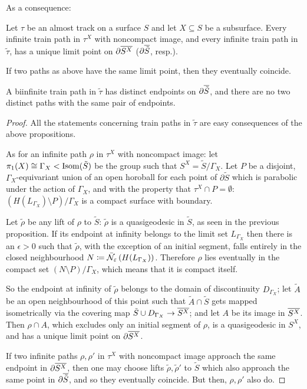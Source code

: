 As a consequence:
\begin{coroll}\label{cor:distinctends}
Let $\tau$ be an almost track on a surface $S$ and let $X\subseteq S$ be a subsurface. Every infinite train path in $\tau^X$ with noncompact image, and every infinite train path in $\tilde\tau$, has a unique limit point on $\partial\overline{S^X}$ ($\partial\overline{\tilde S}$, resp.).

If two paths as above have the same limit point, then they eventually coincide.

A biinfinite train path in $\tilde\tau$ has distinct endpoints on $\partial\overline{\tilde S}$, and there are no two distinct paths with the same pair of endpoints.
\end{coroll}

\begin{proof}
All the statements concerning train paths in $\tilde\tau$ are easy consequences of the above propositions.

As for an infinite path $\rho$ in $\tau^X$ with noncompact image: let $\pi_1(X)\cong\Gamma_X<\mathrm{Isom}(\tilde S)$ be the group such that $S^X=\tilde S/\Gamma_X$. Let $P$ be a disjoint, $\Gamma_X$-equivariant union of an open horoball for each point of $\partial\tilde S$ which is parabolic under the action of $\Gamma_X$, and with the property that $\tau^X\cap P=\emptyset$: $\left(H(L_{\Gamma_X})\setminus P\right)/\Gamma_X$ is a compact surface with boundary. 

Let $\tilde\rho$ be any lift of $\rho$ to $\tilde S$: $\tilde\rho$ is a quasigeodesic in $\tilde S$, as seen in the previous proposition. If its endpoint at infinity belongs to the limit set $L_{\Gamma_X}$ then there is an $\epsilon>0$ such that $\tilde\rho$, with the exception of an initial segment, falls entirely in the closed neighbourhood $N\coloneqq\bar{{\mathcal N}}_\varepsilon\left(H(L_{\Gamma_X})\right)$. Therefore $\rho$ lies eventually in the compact set $(N\setminus P)/ \Gamma_X$, which means that it is compact itself.

So the endpoint at infinity of $\tilde\rho$ belongs to the domain of discontinuity $D_{\Gamma_X}$; let $\tilde A$ be an open neighbourhood of this point such that $\tilde A\cap \tilde S$ gets mapped isometrically via the covering map $\tilde S\cup D_{\Gamma_X}\rightarrow \overline{S^X}$; and let $A$ be its image in $\overline{S^X}$. Then $\rho\cap A$, which excludes only an initial segment of $\rho$, is a quasigeodesic in $S^X$, and has a unique limit point on $\partial\overline{S^X}$.

If two infinite paths $\rho,\rho'$ in $\tau^X$ with noncompact image approach the same endpoint in $\partial\overline{S^X}$, then one may choose lifts $\tilde\rho,\tilde\rho'$ to $\tilde S$ which also approach the same point in $\partial\overline{\tilde S}$, and so they eventually coincide. But then, $\rho, \rho'$ also do.
\end{proof}

